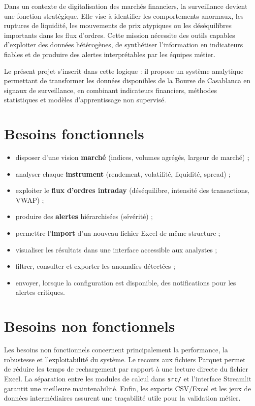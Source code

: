 \documentclass[a4paper,12pt,twoside,openright]{report}
\begin{document}
Dans un contexte de digitalisation des marchés financiers, la surveillance devient une fonction stratégique. Elle vise à identifier les comportements anormaux, les ruptures de liquidité, les mouvements de prix atypiques ou les déséquilibres importants dans les flux d'ordres. Cette mission nécessite des outils capables d'exploiter des données hétérogènes, de synthétiser l'information en indicateurs fiables et de produire des alertes interprétables par les équipes métier.

Le présent projet s'inscrit dans cette logique : il propose un système analytique permettant de transformer les données disponibles de la Bourse de Casablanca en signaux de surveillance, en combinant indicateurs financiers, méthodes statistiques et modèles d'apprentissage non supervisé.

\section{Besoins fonctionnels}
\begin{itemize}
  \item disposer d'une vision \textbf{marché} (indices, volumes agrégés, largeur de marché) ;
  \item analyser chaque \textbf{instrument} (rendement, volatilité, liquidité, spread) ;
  \item exploiter le \textbf{flux d'ordres intraday} (déséquilibre, intensité des transactions, VWAP) ;
  \item produire des \textbf{alertes} hiérarchisées (sévérité) ;
  \item permettre l'\textbf{import} d'un nouveau fichier Excel de même structure ;
  \item visualiser les résultats dans une interface accessible aux analystes ;
  \item filtrer, consulter et exporter les anomalies détectées ;
  \item envoyer, lorsque la configuration est disponible, des notifications pour les alertes critiques.
\end{itemize}

\section{Besoins non fonctionnels}
Les besoins non fonctionnels concernent principalement la performance, la robustesse et l'exploitabilité du système. Le recours aux fichiers Parquet permet de réduire les temps de rechargement par rapport à une lecture directe du fichier Excel. La séparation entre les modules de calcul dans \texttt{src/} et l'interface Streamlit garantit une meilleure maintenabilité. Enfin, les exports CSV/Excel et les jeux de données intermédiaires assurent une traçabilité utile pour la validation métier.
\end{document}
